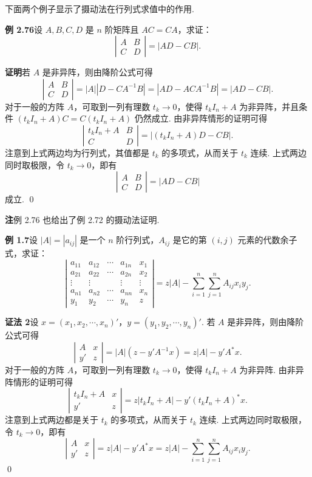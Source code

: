 \documentclass[UTF8, 12pt, fontset=fandol, oneside]{ctexart}
\begin{document}
下面两个例子显示了摄动法在行列式求值中的作用.

\noindent\textbf{例 2.76}\quad 设 $A,B,C,D$ 是 $n$ 阶矩阵且 $AC=CA$，求证：
\[
\left|
\begin{array}{cc}
A & B\\
C & D
\end{array}
\right|
=|AD-CB|.
\]

\noindent\textbf{证明}\quad 若 $A$ 是非异阵，则由降阶公式可得
\[
\left|
\begin{array}{cc}
A & B\\
C & D
\end{array}
\right|
=|A||D-CA^{-1}B|=|AD-ACA^{-1}B|=|AD-CB|.
\]
对于一般的方阵 $A$，可取到一列有理数 $t_k\to0$，使得 $t_kI_n+A$ 为非异阵，并且条件 $(t_kI_n+A)C=C(t_kI_n+A)$ 仍然成立. 由非异阵情形的证明可得
\[
\left|
\begin{array}{cc}
t_kI_n+A & B\\
C & D
\end{array}
\right|
=|(t_kI_n+A)D-CB|.
\]
注意到上式两边均为行列式，其值都是 $t_k$ 的多项式，从而关于 $t_k$ 连续. 上式两边同时取极限，令 $t_k\to0$，即有
\[
\left|
\begin{array}{cc}
A & B\\
C & D
\end{array}
\right|
=|AD-CB|
\]
成立. \qed

\noindent\textbf{注}\quad 例 2.76 也给出了例 2.72 的摄动法证明.

\noindent\textbf{例 1.7}\quad 设 $|A|=|a_{ij}|$ 是一个 $n$ 阶行列式，$A_{ij}$ 是它的第 $(i,j)$ 元素的代数余子式，求证：
\[
\left|
\begin{array}{ccccc}
a_{11} & a_{12} & \cdots & a_{1n} & x_1\\
a_{21} & a_{22} & \cdots & a_{2n} & x_2\\
\vdots & \vdots & & \vdots & \vdots\\
a_{n1} & a_{n2} & \cdots & a_{nn} & x_n\\
y_1 & y_2 & \cdots & y_n & z
\end{array}
\right|
=z|A|-\sum_{i=1}^n\sum_{j=1}^n A_{ij}x_iy_j.
\]

\noindent\textbf{证法 2}\quad 设 $x=(x_1,x_2,\cdots,x_n)'$，$y=(y_1,y_2,\cdots,y_n)'$. 若 $A$ 是非异阵，则由降阶公式可得
\[
\left|
\begin{array}{cc}
A & x\\
y' & z
\end{array}
\right|
=|A|(z-y'A^{-1}x)=z|A|-y'A^*x.
\]
对于一般的方阵 $A$，可取到一列有理数 $t_k\to0$，使得 $t_kI_n+A$ 为非异阵. 由非异阵情形的证明可得
\[
\left|
\begin{array}{cc}
t_kI_n+A & x\\
y' & z
\end{array}
\right|
=z|t_kI_n+A|-y'(t_kI_n+A)^*x.
\]
注意到上式两边都是关于 $t_k$ 的多项式，从而关于 $t_k$ 连续. 上式两边同时取极限，令 $t_k\to0$，即有
\[
\left|
\begin{array}{cc}
A & x\\
y' & z
\end{array}
\right|
=z|A|-y'A^*x
=z|A|-\sum_{i=1}^n\sum_{j=1}^n A_{ij}x_iy_j.
\]
\qed
\end{document}
